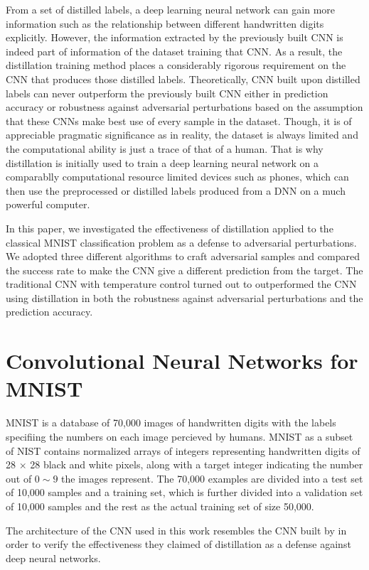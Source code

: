 \documentclass{article}
\begin{document}
From a set of distilled labels, a deep learning neural network can gain more information such as the relationship between different handwritten digits explicitly. However, the information extracted by the previously built CNN is indeed part of information of the dataset training that CNN.
As a result, the distillation training method places a considerably rigorous requirement on the CNN that produces those distilled labels.
Theoretically, CNN built upon distilled labels can never outperform the previously built CNN either in prediction accuracy or robustness against adversarial perturbations based on the assumption that these CNNs make best use of every sample in the dataset. 
Though, it is of appreciable pragmatic significance as in reality, the dataset is always limited and the computational ability is just a trace of that of a human.
That is why distillation is initially used to train a deep learning neural network on a comparablly computational resource limited devices such as phones, which can then use the preprocessed or distilled labels produced from a DNN on a much powerful computer.

In this paper, we investigated the effectiveness of distillation applied to the classical MNIST classification problem as a defense to adversarial perturbations. We adopted three different algorithms to craft adversarial samples and compared the success rate to make the CNN give a different prediction from the target.
The traditional CNN with temperature control turned out to outperformed the CNN using distillation in both the robustness against adversarial perturbations and the prediction accuracy. 

\section{Convolutional Neural Networks for MNIST}
MNIST is a database of 70,000 images of handwritten digits with the labels specifiing the numbers on each image percieved by humans\cite{MNIST}. MNIST as a subset of NIST contains normalized arrays of integers representing handwritten digits of 28 $\times$ 28 black and white pixels, along with a target integer indicating the number out of $0\sim 9$ the images represent.
The 70,000 examples are divided into a test set of 10,000 samples and a training set, which is further divided into a validation set of 10,000 samples and the rest as the actual training set of size 50,000.

The architecture of the CNN used in this work resembles the CNN built by \cite{Papernot} in order to verify the effectiveness they claimed of distillation as a defense against deep neural networks.\cite{MNIST}
\end{document}
